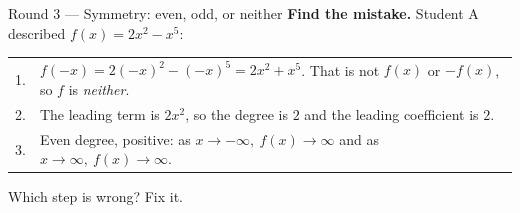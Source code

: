 \documentclass[12pt]{article}
\begin{document}
\begin{notesbox}{Round 3 --- Symmetry: even, odd, or neither}
\textbf{Find the mistake.} Student A described $f(x)=2x^2-x^5$:
\begin{center}
\begin{tabular}{@{}r@{\;}l@{}}
1. & $f(-x)=2(-x)^2-(-x)^5=2x^2+x^5$. That is not $f(x)$ or $-f(x)$, so $f$ is \emph{neither}. \\
2. & The leading term is $2x^2$, so the degree is $2$ and the leading coefficient is $2$. \\
3. & Even degree, positive: as $x\to-\infty,\ f(x)\to\infty$ and as $x\to\infty,\ f(x)\to\infty$. \\
\end{tabular}
\end{center}
Which step is wrong? Fix it.\par
{}\par
{}
\end{notesbox}
\end{document}
